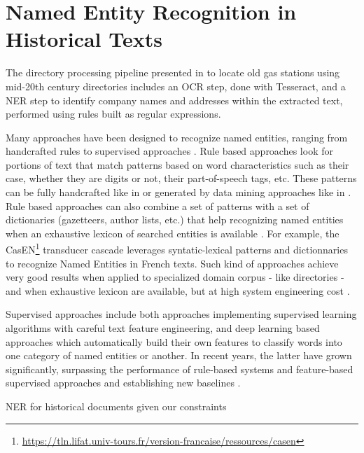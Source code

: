 \section{Named Entity Recognition in Historical Texts}

The directory processing pipeline presented in \cite{bell2020automated} to locate old gas stations using mid-20th century directories includes an OCR step, done with Tesseract, and a NER step to identify company names and addresses within the extracted text, performed using rules built as regular expressions. %

Many approaches have been designed to recognize named entities, ranging from handcrafted rules to supervised approaches \cite{nadeau2007}. Rule based approaches look for portions of text that match patterns based on word characteristics such as their case, whether they are digits or not, their part-of-speech tags, etc. These patterns can be fully handcrafted like in \cite{bell2020automated} or generated by data mining approaches like in \cite{nouvel2011}. Rule based approaches can also combine a set of patterns with a set of dictionaries (gazetteers, author lists, etc.) that help recognizing named entities when an exhaustive lexicon of searched entities is available \cite{mansouri2008,maurel2011}. For example, the CasEN\footnote{\url{https://tln.lifat.univ-tours.fr/version-francaise/ressources/casen}} transducer cascade leverages syntatic-lexical patterns and dictionnaries to recognize Named Entities in French texts. Such kind of approaches achieve very good results when applied to specialized domain corpus - like directories - and when exhaustive lexicon are available, but at high system engineering cost \cite{nadeau2007}. 

Supervised approaches include both approaches implementing supervised learning algorithms with careful text feature engineering, and deep learning based approaches which automatically build their own features to classify words into one category of named entities or another. In recent years, the latter have grown significantly, surpassing the performance of rule-based systems and feature-based supervised approaches and establishing new baselines \cite{li2020}.


NER for historical documents given our constraints